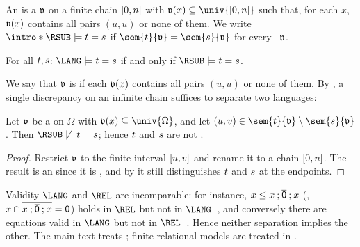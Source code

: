 \AP An  is a  $\mathfrak{v}$ on a finite chain $[0, n]$ with $\val(x) \subseteq \univ{\range{0, n}}$ such that, for each $x$, $\mathfrak{v}(x)$ contains all pairs $(u, u)$ or none of them.
We write $\intro*\RSUB \models \term[1] = \term[2]$ if $\sem{\term[1]}{\val} = \sem{\term[2]}{\val}$ for every ~$\mathfrak{v}$.
\begin{theorem}\label{theorem: LANG RSUB}
    For all  $\term[1], \term[2]$: $\LANG \models \term[1] = \term[2]$ if and only if $\RSUB \models \term[1] = \term[2]$.
\end{theorem}
\AP We say that $\mathfrak{v}$ is  if each $\mathfrak{v}(x)$ contains all pairs $(u, u)$ or none of them.
By , a single discrepancy on an infinite chain suffices to separate two   languages:
\begin{corollary}\label{corollary: transfer}
    Let $\mathfrak{v}$ be a   on $\Omega$ with $\val(x) \subseteq \univ{\Omega}$, and let $(u, v) \in \sem{\term[1]}{\val} \setminus \sem{\term[2]}{\val}$.
    Then $\RSUB \not\models \term[1] = \term[2]$; hence $\term[1]$ and $\term[2]$ are not .
\end{corollary}
\begin{proof}
    Restrict $\mathfrak{v}$ to the finite interval $[u, v]$ and rename it to a chain $[0, n]$.
    The result is an  since it is , and by  it still distinguishes $\term[1]$ and $\term[2]$ at the endpoints.
\end{proof}
Validity  $\LANG$ and  $\REL$ are incomparable:
for instance, $x \le x \mathbin{;} \overline{\mathsf{0}} \mathbin{;} x$ (\ie, $x \mathbin{\cap} \overline{x \mathbin{;} \overline{\mathsf{0}} \mathbin{;} x} = \mathsf{0}$) holds in $\REL$ but not in $\LANG$~\cite{pousCompletenessTheoremsKleene2022},
and conversely there are equations valid in $\LANG$ but not in $\REL$~\cite{nakamuraFiniteRelationalSemantics2025}.
Hence neither separation implies the other.
The main text treats ; finite relational models are treated in .


